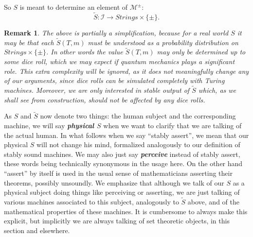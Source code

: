 \documentclass{amsart}  %
\numberwithin{equation}{section}
\newtheorem{remark}[equation]{Remark}
\theoremstyle{definition}
\theoremstyle{remark}
\begin{document}
{So $S$ is meant to determine an element of $ \mathcal{M} ^{\pm} $: 
\begin{equation} \label{eq:Smachine}
\widetilde{S}: \mathcal{I} \to Strings \times \{\pm\}. 
\end{equation}
\begin{remark} \label{remark:simplification} The above is partially a simplification, because for a real world $S$ it may be that each $\widetilde{S}  (T,m)$ must be understood as a probability distribution on $Strings \times \{\pm\}$. In other words the value $\widetilde{S}  (T,m)$ may only be determined up to some dice roll, which we may expect if quantum mechanics plays a significant role. This extra complexity will be ignored,  as it does not meaningfully change any of our arguments, since dice rolls can be simulated completely with Turing machines.  Moreover, we are only interested in stable output of $\widetilde{S} $ which, as we shall see from construction, should not be affected by any dice rolls.
\end{remark}
As $S$ and $\widetilde{S} $ now denote two things: the human subject and the corresponding machine, we will say \textbf{\emph{physical $S$}} when we want to clarify that we are talking of the actual  human.  In what follows when we say  ``stably assert'', we mean that our physical $S$ will not change his mind,  formalized analogously to our definition of stably sound machines. We may also just say \textbf{\emph{perceive}} instead of stably assert, these words being technically synonymous in the usage here. On the other hand ``assert'' by itself is used in the usual sense of mathematicians asserting their theorems, possibly unsoundly. We emphasize that although we talk of our $S$ as a physical subject doing things like perceiving or asserting, we are just talking of various machines associated to this subject, analogously to $\widetilde{S} $ above, and of the mathematical properties of these machines. It is cumbersome to always make this explicit, but implicitly we are always talking of set theoretic objects, in this section and elsewhere.
}
\end{document}
